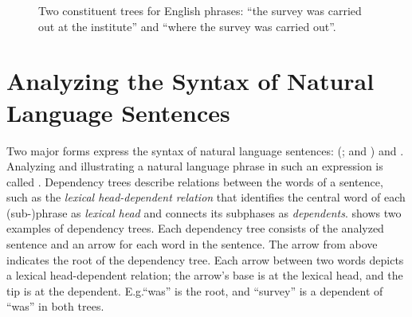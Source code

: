 \documentclass[../document.tex]{subfiles}
\begin{document}
    \begin{figure}
        \null\hfill
        
        \hfill
        
        \hfill\null
        \caption{\label{fig:constituent}
            Two constituent trees for English phrases: ``the survey was carried out at the institute'' and ``where the survey was carried out''.
        }
    \end{figure}

    \section*{Analyzing the Syntax of Natural Language Sentences}
    Two major forms express the syntax of natural language sentences:  (\citealp[Section~2.1]{Kue09}; and \citealp[Section~18.1]{Jur23}) and  \citep[Section~3]{Cho56}.
    Analyzing and illustrating a natural language phrase in such an expression is called .
    Dependency trees describe relations between the words of a sentence, such as the \emph{lexical head-dependent relation} that identifies the central word of each (sub-)phrase as \emph{lexical head} and connects its subphases as \emph{dependents}.
     shows two examples of dependency trees.
    Each dependency tree consists of the analyzed sentence and an arrow for each word in the sentence.
    The arrow from above indicates the root of the dependency tree.
    Each arrow between two words depicts a lexical head-dependent relation; the arrow's base is at the lexical head, and the tip is at the dependent.
    E.g.\@ ``was'' is the root, and ``survey'' is a dependent of ``was'' in both trees.
\end{document}
